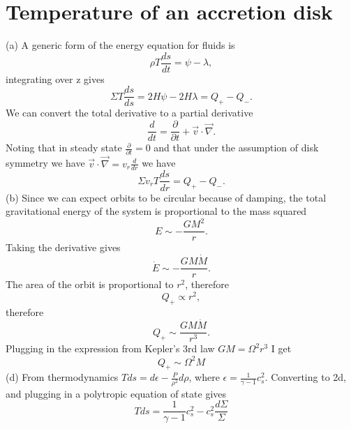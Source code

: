 \documentclass[11pt]{article}
\begin{document}
\section{Temperature of an accretion disk}
\label{sec:org181564b}
(a) A generic form of the energy equation for fluids is
\begin{equation}
 \rho T \frac{ds}{dt} = \psi - \lambda,
\end{equation}
integrating over z gives
\begin{equation}
 \Sigma T \frac{ds}{ds} = 2 H \psi - 2 H \lambda = Q_+ - Q_-.
\end{equation}
We can convert the total derivative to a partial derivative
\begin{equation}
 \frac{d}{dt} = \frac{\partial }{\partial t} + \vec{v} \cdot \vec{\nabla}.
\end{equation}
Noting that in steady state \(\frac{\partial }{\partial t} = 0\) and that under the assumption of disk symmetry we have \(\vec{v} \cdot \vec{\nabla} = v_r \frac{d}{dr}\) we have
\begin{equation}
 \Sigma v_r T \frac{ds}{dr} = Q_+ - Q_- .
\end{equation}
\newline
(b) Since we can expect orbits to be circular because of damping, the total gravitational energy of the system is proportional to the mass squared
\begin{equation}
 E \sim -\frac{G M^2}{r}.
\end{equation}
Taking the derivative gives
\begin{equation}
 \dot{E} \sim -\frac{G M \dot{M}}{r}.
\end{equation}
The area of the orbit is proportional to \(r^2\), therefore
\begin{equation}
 Q_+ \propto r^2,
\end{equation}
therefore
\begin{equation}
 Q_+ \sim \frac{G M \dot{M}}{r^3}.
\end{equation}
Plugging in the expression from Kepler's 3rd law \(GM = \Omega^2 r^3\) I get
\begin{equation}
 Q_+ \sim \Omega^2 M
\end{equation}
\newline
(d) From thermodynamics \(Tds = d \epsilon - \frac{P}{\rho^2}d\rho\), where \(\epsilon  = \frac{1}{\gamma - 1} c_s^2\).
Converting to 2d, and plugging in a polytropic equation of state gives
\begin{equation}
 Tds = \frac{1}{\gamma - 1} c_s^2 - c_s^2 \frac{d \Sigma}{\Sigma}
\end{equation}
\end{document}
